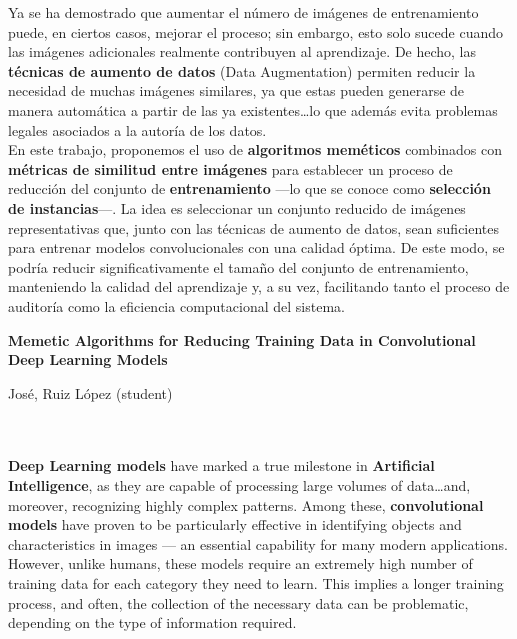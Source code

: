 Ya se ha demostrado que aumentar el número de imágenes de entrenamiento puede, en ciertos casos, mejorar el proceso;
sin embargo, esto solo sucede cuando las imágenes adicionales realmente contribuyen al aprendizaje.
De hecho, las \textbf{técnicas de aumento de datos} (Data Augmentation) permiten reducir la necesidad de muchas
imágenes similares, ya que estas pueden generarse de manera automática a partir de las ya existentes\ldots lo que además
evita problemas legales asociados a la autoría de los datos. \\[6pt]

En este trabajo, proponemos el uso de \textbf{algoritmos meméticos} combinados con
\textbf{métricas de similitud entre imágenes} para establecer un proceso de reducción del conjunto de
\textbf{entrenamiento} —lo que se conoce como \textbf{selección de instancias}—.
La idea es seleccionar un conjunto reducido de imágenes representativas que, junto con las técnicas de aumento de
datos, sean suficientes para entrenar modelos convolucionales con una calidad óptima.
De este modo, se podría reducir significativamente el tamaño del conjunto de entrenamiento, manteniendo la calidad
del aprendizaje y, a su vez, facilitando tanto el proceso de auditoría como la eficiencia computacional del sistema.
\\[6pt]


\cleardoublepage


\thispagestyle{empty}


\begin{center}
       {\large\bfseries Memetic Algorithms for Reducing Training Data in Convolutional Deep Learning Models}\\
\end{center}
\begin{center}
       José, Ruiz López (student)\\
\end{center}

\\

\vspace{0.7cm}
\\

\textbf{Deep Learning models} have marked a true milestone in \textbf{Artificial Intelligence}, as they are capable of
processing large volumes of data\ldots and, moreover, recognizing highly complex patterns.
Among these, \textbf{convolutional models} have proven to be particularly effective in identifying objects and
characteristics in images — an essential capability for many modern applications.
However, unlike humans, these models require an extremely high number of training data for each category they need to
learn.
This implies a longer training process, and often, the collection of the necessary data can be problematic, depending
on the type of information required. \\[6pt]

